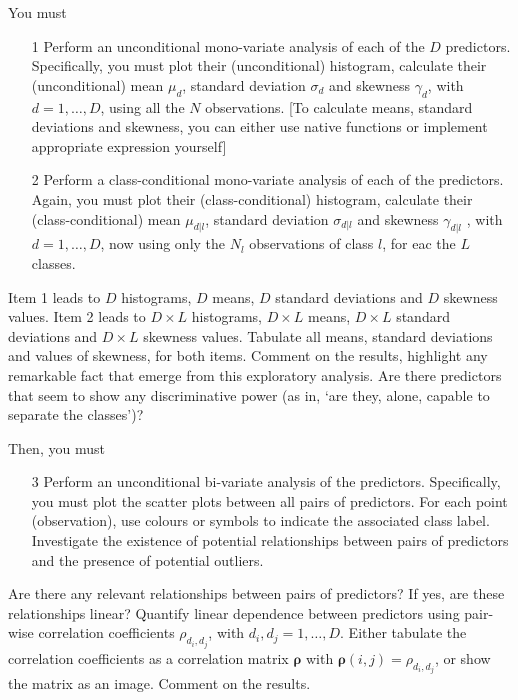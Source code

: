 \documentclass[a4paper,11pt]{article}
\begin{document}
\vskip0.20cm\noindent You must
\begin{enumerate}
\item[1] Perform an unconditional mono-variate analysis of each of the $D$ predictors. Specifically, you must plot their (unconditional) histogram, calculate their (unconditional) mean $\mu_d$, standard deviation $\sigma_d$ and skewness $\gamma_d$, with $d=1,\dots,D$, using all the $N$ observations. [To calculate means, standard deviations and skewness, you can either use native functions or implement appropriate expression yourself]
\item[2] Perform a class-conditional mono-variate analysis of each of the predictors. Again, you must plot their (class-conditional) histogram, calculate their (class-conditional) mean $\mu_{d|l}$, standard deviation $\sigma_{d|l}$ and skewness $\gamma_{d|l}$ , with $d=1,\dots,D$, now using only the $N_l$ observations of class $l$, for eac the $L$ classes.  
\end{enumerate}
\noindent Item 1 leads to $D$ histograms, $D$ means, $D$ standard deviations and $D$ skewness values. Item 2 leads to $D \times L$ histograms, $D \times L$ means, $D \times L$ standard deviations and $D \times L$ skewness values. Tabulate all means, standard deviations and values of skewness, for both items. Comment on the results, highlight any remarkable fact that emerge from this exploratory analysis. Are there predictors that seem to show any discriminative power (as in, `are they, alone, capable to separate the classes')?

\vskip0.25cm\noindent Then, you must
\begin{enumerate}
\item[3] Perform an unconditional bi-variate analysis of the predictors. Specifically, you must plot the scatter plots between all pairs of predictors. For each point (observation), use colours or symbols to indicate the associated class label. Investigate the existence of potential relationships between pairs of predictors and the presence of potential outliers.
\end{enumerate}
Are there any relevant relationships between pairs of predictors? If yes, are these relationships linear? Quantify linear dependence between predictors using pair-wise correlation coefficients $\rho_{d_i,d_j}$, with $d_i,d_j=1,\dots,D$. Either tabulate the correlation coefficients as a correlation matrix $\bm{\rho}$ with $\bm{\rho}(i,j) = \rho_{d_i,d_j}$, or show the matrix as an image. Comment on the results.
\end{document}
